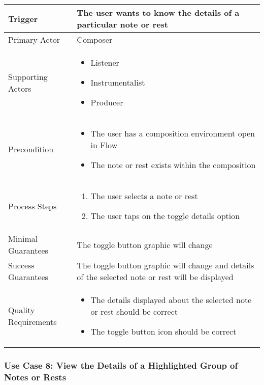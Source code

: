 \begin{tabularx}{\textwidth}{|X|X|}
\hline
Trigger & 
The user wants to know the details of a particular note or rest\\
\hline
Primary Actor & 
Composer \\
\hline
Supporting Actors & 
\begin{itemize}
\item Listener
\item Instrumentalist
\item Producer
\end{itemize} \\
\hline
Precondition & 
\begin{itemize}
\item The user has a composition environment open in Flow
\item The note or rest exists within the composition
\end{itemize} \\
\hline
Process Steps & 
\begin{enumerate}
\item The user selects a note or rest
\item The user taps on the toggle details option
\end{enumerate} \\
\hline
Minimal Guarantees & 
The toggle button graphic will change\\
\hline
Success Guarantees & 
The toggle button graphic will change and details of the selected note or rest will be displayed \\
\hline
Quality Requirements & 
\begin{itemize}
\item The details displayed about the selected note or rest should be correct
\item The toggle button icon should be correct
\end{itemize} \\ 
\hline
\end{tabularx}


\subsubsection{Use Case 8: View the Details of a Highlighted Group of Notes or Rests}

